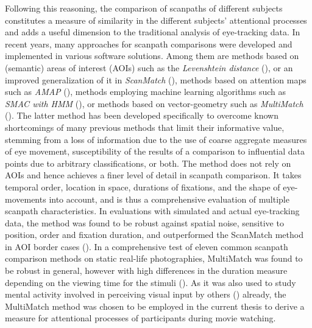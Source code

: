 \documentclass[a4paper, 12pt]{scrreprt}
\begin{document}
Following this reasoning, the comparison of scanpaths of different subjects constitutes a measure of similarity in the different subjects’ attentional processes and adds a useful dimension to the traditional analysis of eye-tracking data. In recent years, many approaches for scanpath comparisons were developed and implemented in various software solutions. Among them are methods based on (semantic) areas of interest (AOIs) such as the \textit{Levenshtein distance} (\cite{levenshtein1966binary}), or an improved generalization of it in \textit{ScanMatch} (\cite{cristino2010scanmatch}), methods based on attention maps such as \textit{AMAP} (\cite{ouerhani2004empirical}), methods employing machine learning algorithms such as \textit{SMAC with HMM} (\cite{coutrot2018scanpath}), or methods based on vector-geometry such as \textit{MultiMatch} (\cite{jarodzka2010vector}). The latter method has been developed specifically to overcome known shortcomings of many previous methods that limit their informative value, stemming from a loss of information due to the use of coarse aggregate measures of eye movement, susceptibility of the results of a comparison to influential data points due to arbitrary classifications, or both. The method does not rely on AOIs and hence achieves a finer level of detail in scanpath comparison. It takes temporal order, location in space, durations of fixations, and the shape of eye-movements into account, and is thus a comprehensive evaluation of multiple scanpath characteristics. In evaluations with simulated and actual eye-tracking data, the method was found to be robust against spatial noise, sensitive to position, order and fixation duration, and outperformed the ScanMatch method in AOI border cases (\cite{dewhurst2012depends}). In a comprehensive test of eleven common scanpath comparison methods on static real-life photographies, MultiMatch was found to be robust in general, however with high differences in the duration measure depending on the viewing time for the stimuli (\cite{anderson2015comparison}). As it was also used to study mental activity involved in perceiving visual input by others (\cite{french2017evaluation}) already, the MultiMatch method was chosen to be employed in the current thesis to derive a measure for attentional processes of participants during movie watching. 
\end{document}
